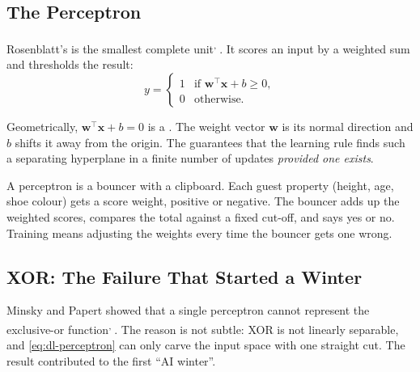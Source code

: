 \subsection{The Perceptron}

Rosenblatt's  is the smallest complete
unit\textsuperscript{\cite{rosenblattPerceptronProbabilisticModel1958},
\cite[][pp.~57--62]{Kriesel2007NeuralNetworks}}. It scores an input by a
weighted sum and thresholds the result:
\begin{equation}
  y =
  \begin{cases}
    1 & \text{if } \mathbf{w}^{\!\top}\mathbf{x} + b \geq 0,\\[2pt]
    0 & \text{otherwise.}
  \end{cases}
  \label{eq:dl-perceptron}
\end{equation}

Geometrically, $\mathbf{w}^{\!\top}\mathbf{x} + b = 0$ is a
. The weight vector $\mathbf{w}$ is its normal direction and
$b$ shifts it away from the origin. The  guarantees that the learning rule finds such a separating hyperplane in
a finite number of updates \emph{provided one exists}.

\begin{plainlanguage}
A perceptron is a bouncer with a clipboard. Each guest property (height, age,
shoe colour) gets a score weight, positive or negative. The bouncer adds up the
weighted scores, compares the total against a fixed cut-off, and says yes or
no. Training means adjusting the weights every time the bouncer gets one wrong.
\end{plainlanguage}

\subsection{XOR: The Failure That Started a Winter}

Minsky and Papert showed that a single perceptron cannot represent the
exclusive-or function\textsuperscript{\cite{minskyPerceptronsIntroductionComputational1969},
\cite[][pp.~63--65]{Kriesel2007NeuralNetworks}}. The reason is not subtle: XOR
is not linearly separable, and \cref{eq:dl-perceptron} can only carve the input
space with one straight cut. The result contributed to the first ``AI winter''.

